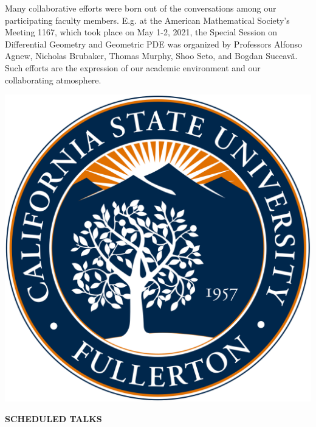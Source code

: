 \documentclass[a4paper]{article}
\begin{document}
\begin{minipage}{0.95\textwidth}
\begin{minipage}[b]{0.47\textwidth}
Many collaborative efforts were born out of the conversations among our participating faculty members. E.g. at the
American Mathematical Society's Meeting 1167, which took place on May 1-2, 2021, the Special Session on
Differential Geometry and Geometric PDE was organized by Professors Alfonso Agnew, Nicholas Brubaker, Thomas
Murphy, Shoo Seto, and Bogdan Suceav\u{a}. Such efforts are the expression of our academic environment and our
collaborating atmosphere.
\medskip
\begin{center}
\includegraphics[width=0.7\linewidth]{csuf_seal.png}
\end{center}
\smallskip

\rule{0pt}{32pt}
\end{minipage}\hspace{5pt}
\begin{minipage}[b]{0.47\textwidth}
\textbf{\color{csecondary}\large SCHEDULED TALKS}\par



\end{minipage}
\end{minipage}
\end{document}
